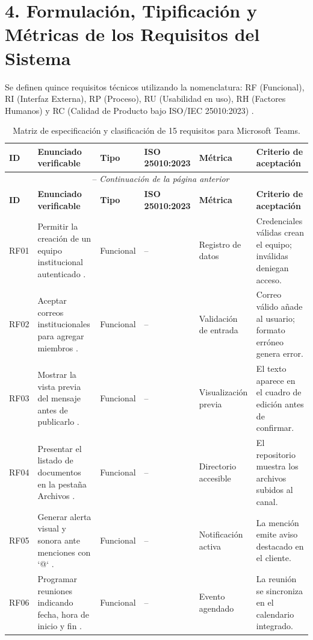 \documentclass[11pt,a4paper]{article}
\begin{document}
	\section*{\textbf{4. Formulación, Tipificación y Métricas de los Requisitos del Sistema}}
	Se definen quince requisitos técnicos utilizando la nomenclatura: RF (Funcional), RI (Interfaz Externa), RP (Proceso), RU (Usabilidad en uso), RH (Factores Humanos) y RC (Calidad de Producto bajo ISO/IEC 25010:2023) \cite{iso25010_2023}.
	
	\begin{longtable}{p{0.8cm} p{4.3cm} p{1.6cm} p{2.3cm} p{2.2cm} p{2.8cm}}
		\caption{Matriz de especificación y clasificación de 15 requisitos para Microsoft Teams.} \\
		\toprule
		\textbf{ID} & \textbf{Enunciado verificable} & \textbf{Tipo} & \textbf{ISO 25010:2023} & \textbf{Métrica} & \textbf{Criterio de aceptación} \\
		\midrule
		\endfirsthead
		\multicolumn{6}{c}{\tablename\ \thetable\ -- \textit{Continuación de la página anterior}} \\
		\toprule
		\textbf{ID} & \textbf{Enunciado verificable} & \textbf{Tipo} & \textbf{ISO 25010:2023} & \textbf{Métrica} & \textbf{Criterio de aceptación} \\
		\midrule
		\endhead
		\bottomrule
		\endfoot
		RF01 & Permitir la creación de un equipo institucional autenticado \cite{iso29148_2018}. & Funcional & -- & Registro de datos & Credenciales válidas crean el equipo; inválidas deniegan acceso. \\
		RF02 & Aceptar correos institucionales para agregar miembros \cite{iso29148_2018}. & Funcional & -- & Validación de entrada & Correo válido añade al usuario; formato erróneo genera error. \\
		RF03 & Mostrar la vista previa del mensaje antes de publicarlo \cite{iso29148_2018}. & Funcional & -- & Visualización previa & El texto aparece en el cuadro de edición antes de confirmar. \\
		RF04 & Presentar el listado de documentos en la pestaña Archivos \cite{iso29148_2018}. & Funcional & -- & Directorio accesible & El repositorio muestra los archivos subidos al canal. \\
		RF05 & Generar alerta visual y sonora ante menciones con `@` \cite{iso29148_2018}. & Funcional & -- & Notificación activa & La mención emite aviso destacado en el cliente. \\
		RF06 & Programar reuniones indicando fecha, hora de inicio y fin \cite{iso29148_2018}. & Funcional & -- & Evento agendado & La reunión se sincroniza en el calendario integrado. \\

\end{longtable}
\end{document}
